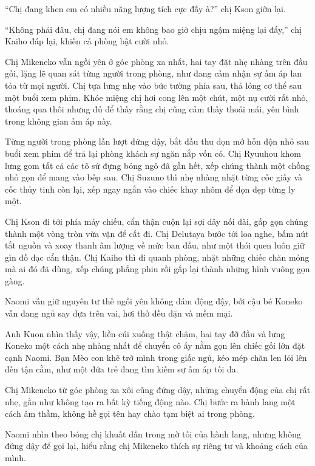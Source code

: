 \documentclass[../main.tex]{subfiles}
\begin{document}
``Chị đang khen em có nhiều năng lượng tích cực đấy à?'' chị Kson giỡn lại.

``Không phải đâu, chị đang nói em không bao giờ chịu ngậm miệng lại đấy,'' chị Kaiho đáp lại, khiến cả phòng bật cười nhỏ.

Chị Mikeneko vẫn ngồi yên ở góc phòng xa nhất, hai tay đặt nhẹ nhàng trên đầu gối, lặng lẽ quan sát từng người trong phòng, như đang cảm nhận sự ấm áp lan tỏa từ mọi người. Chị tựa lưng nhẹ vào bức tường phía sau, thả lỏng cơ thể sau một buổi xem phim. Khóe miệng chị hơi cong lên một chút, một nụ cười rất nhỏ, thoáng qua thôi nhưng đủ để thấy rằng chị cũng cảm thấy thoải mái, yên bình trong không gian ấm áp này.

\ct

Từng người trong phòng lần lượt đứng dậy, bắt đầu thu dọn mớ hỗn độn nhỏ sau buổi xem phim để trả lại phòng khách sự ngăn nắp vốn có. Chị Ryuuhou khom lưng gom tất cả các tô sứ đựng bỏng ngô đã gần hết, xếp chúng thành một chồng nhỏ gọn để mang vào bếp sau. Chị Suzuno thì nhẹ nhàng nhặt từng cốc giấy và cốc thủy tinh còn lại, xếp ngay ngắn vào chiếc khay nhôm để dọn dẹp từng ly một. 

Chị Kson đi tới phía máy chiếu, cẩn thận cuộn lại sợi dây nối dài, gấp gọn chúng thành một vòng tròn vừa vặn để cất đi. Chị Delutaya bước tới loa nghe, bấm nút tắt nguồn và xoay thanh âm lượng về mức ban đầu, như một thói quen luôn giữ gìn đồ đạc cẩn thận. Chị Kaiho thì đi quanh phòng, nhặt những chiếc chăn mỏng mà ai đó đã dùng, xếp chúng phẳng phiu rồi gấp lại thành những hình vuông gọn gàng.

Naomi vẫn giữ nguyên tư thế ngồi yên không dám động đậy, bởi cậu bé Koneko vẫn đang ngủ say dựa trên vai, hơi thở đều đặn và mềm mại. 

Anh Kuon nhìn thấy vậy, liền cúi xuống thật chậm, hai tay đỡ đầu và lưng Koneko một cách nhẹ nhàng nhất để chuyển cô ấy nằm gọn lên chiếc gối lớn đặt cạnh Naomi. Bạn Mèo con khẽ trở mình trong giấc ngủ, kéo mép chăn len lỏi lên đến tận cằm, như một đứa trẻ đang tìm kiếm sự ấm áp tối đa.

Chị Mikeneko từ góc phòng xa xôi cũng đứng dậy, những chuyển động của chị rất nhẹ, gần như không tạo ra bất kỳ tiếng động nào. Chị bước ra hành lang một cách âm thầm, không hề gọi tên hay chào tạm biệt ai trong phòng.

Naomi nhìn theo bóng chị khuất dần trong mờ tối của hành lang, nhưng không đứng dậy để gọi lại, hiểu rằng chị Mikeneko thích sự riêng tư và khoảng cách của mình.
\end{document}
